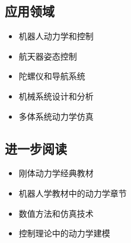 \documentclass[12pt,a4paper]{article}
\begin{document}
\subsection{应用领域}

\begin{itemize}
\item 机器人动力学和控制
\item 航天器姿态控制
\item 陀螺仪和导航系统
\item 机械系统设计和分析
\item 多体系统动力学仿真
\end{itemize}

\subsection{进一步阅读}

\begin{itemize}
\item 刚体动力学经典教材
\item 机器人学教材中的动力学章节
\item 数值方法和仿真技术
\item 控制理论中的动力学建模
\end{itemize}
\end{document}
